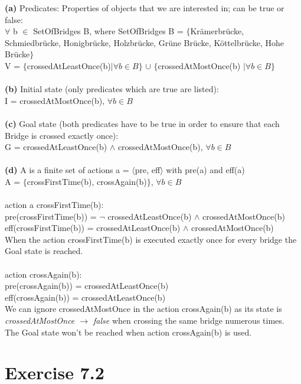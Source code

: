 \documentclass[12pt]{article}
\begin{document}
\textbf{(a)} Predicates: Properties of objects that we are interested in; can be true or false:\\
$\forall$ b $\in$ SetOfBridges B, where SetOfBridges B = $\{$Krämerbrücke, Schmiedbrücke, Honigbrücke, Holzbrücke, Grüne Brücke, Köttelbrücke, Hohe Brücke$\}$\\
V = $\{$crossedAtLeastOnce(b)$\mid \forall b \in B \}$ $\cup$ $\{$crossedAtMostOnce(b) $\mid \forall b \in B\}$\\\\
\textbf{(b)} Initial state (only predicates which are true are listed):\\
I = crossedAtMostOnce(b), $\forall b \in B$\\\\
\textbf{(c)} Goal state (both predicates have to be true in order to ensure that each Bridge is crossed exactly once):\\
G = crossedAtLeastOnce(b) $\land$ crossedAtMostOnce(b), $\forall b \in B$\\\\
\textbf{(d)} A is a finite set of actions a = $\langle$pre, eff$\rangle$ with pre(a) and eff(a)\\
A = $\{$crossFirstTime(b), crossAgain(b)$\}$, $\forall b \in B$\\\\
action a crossFirstTime(b):\\
pre(crossFirstTime(b)) = $\neg$ crossedAtLeastOnce(b) $\land$ crossedAtMostOnce(b)\\
eff(crossFirstTime(b)) = crossedAtLeastOnce(b) $\land$ crossedAtMostOnce(b)\\
When the action crossFirstTime(b) is executed exactly once for every bridge the Goal state is reached.\\\\
action crossAgain(b):\\
pre(crossAgain(b)) = crossedAtLeastOnce(b)\\
eff(crossAgain(b)) = crossedAtLeastOnce(b)\\
We can ignore crossedAtMostOnce in the action crossAgain(b) as its state is\\
\emph{crossedAtMostOnce $\to$ false} when crossing the same bridge numerous times.\\
The Goal state won't be reached when action crossAgain(b) is used.\pagebreak

\section*{Exercise 7.2}
\end{document}
